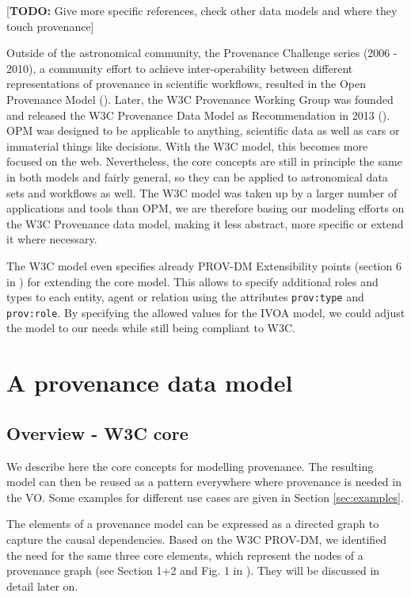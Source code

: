 \documentclass[11pt,a4paper]{ivoa}
\newcommand{\TODO}[1]{\noindent \textcolor{todocolor}{[\textbf{TODO:} #1]}}
\begin{document}
\TODO{Give more specific references, check other data models and where they touch provenance}

Outside of the astronomical community, the Provenance Challenge series (2006 - 2010), a community effort to achieve inter-operability between different representations of provenance in scientific workflows, resulted in the Open Provenance Model (\cite{moreau2010}). 
Later, the W3C Provenance Working Group was founded and released the W3C Provenance Data Model as Recommendation in 2013 (\cite{std:W3CProvDM}). 
OPM was designed to be applicable to anything, scientific data as well as cars or immaterial things like decisions. With the W3C model, this becomes more focused on the web.  Nevertheless, the core concepts are still in principle the same in both models and fairly general, so they can be applied to astronomical data sets and workflows as well. 
The W3C model was taken up by a larger number of applications and tools than OPM, we are therefore basing our modeling efforts on the W3C Provenance data model, making it less abstract, more specific or extend it where necessary. 


The W3C model even specifies already PROV-DM Extensibility points (section 6 in \cite{std:W3CProvDM}) for extending the core model. This allows to specify additional roles and types to each entity, agent or relation using the attributes \texttt{prov:type} and \texttt{prov:role}.
By specifying the allowed values for the IVOA model, we could adjust the model to our needs while still being compliant to W3C.


\section{A provenance data model}
\subsection{Overview - W3C core}
We describe here the core concepts for modelling provenance. The resulting model can then be reused as a pattern everywhere where provenance
is needed in the VO. Some examples for different use cases are given in Section \ref{sec:examples}.

The elements of a provenance model can be expressed as a directed graph to capture the causal dependencies. 
Based on the W3C PROV-DM, we identified the need for the same three core elements, which represent the nodes of a provenance graph
(see Section 1+2 and Fig. 1 in \cite{std:W3CProvDM}). They will be discussed in detail later on.
\end{document}
